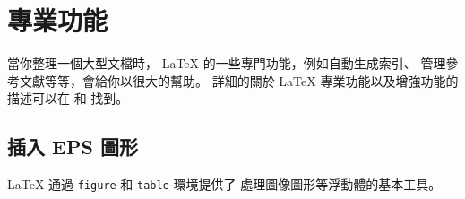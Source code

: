 ﻿%


\chapter{專業功能}

\begin{intro}
  當你整理一個大型文檔時， \LaTeX{} 的一些專門功能，例如自動生成索引、
  管理參考文獻等等，會給你以很大的幫助。
  詳細的關於 \LaTeX{} 專業功能以及增強功能的描述可以在
   {\normalfont\manual{}} 和 {\normalfont \companion} 找到。
\end{intro}


\section{插入 EPS 圖形}\label{eps}


\LaTeX{} 通過 \texttt{figure} 和 \texttt{table} 環境提供了
處理圖像圖形等浮動體的基本工具。


